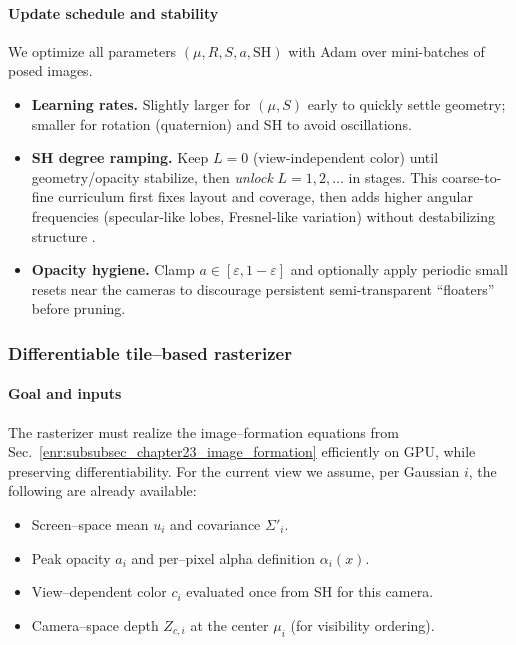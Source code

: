 \begin{enrichment}
\begin{enrichment}
\begin{enrichment}
        \paragraph{Update schedule and stability}
        We optimize all parameters $(\mu,R,S,a,\text{SH})$ with Adam over mini-batches of posed images.
        \begin{itemize}
            \item \textbf{Learning rates.} Slightly larger for $(\mu,S)$ early to quickly settle geometry; smaller for rotation (quaternion) and SH to avoid oscillations.
            \item \textbf{SH degree ramping.} Keep $L{=}0$ (view-independent color) until geometry/opacity stabilize, then \emph{unlock} $L{=}1,2,\ldots$ in stages. This coarse-to-fine curriculum first fixes layout and coverage, then adds higher angular frequencies (specular-like lobes, Fresnel-like variation) without destabilizing structure \cite{kerbl2023_3dgaussiansplatting}.
            \item \textbf{Opacity hygiene.} Clamp $a\in[\varepsilon,1-\varepsilon]$ and optionally apply periodic small resets near the cameras to discourage persistent semi-transparent ``floaters'' before pruning.
        \end{itemize}
        
        \subsubsection{Differentiable tile–based rasterizer}\label{enr:subsubsec_chapter23_3dgs_rasterizer}
        
        \paragraph{Goal and inputs}
        The rasterizer must realize the image–formation equations from Sec.~\ref{enr:subsubsec_chapter23_image_formation} efficiently on GPU, while preserving differentiability.
        For the current view we assume, per Gaussian $i$, the following are already available:
        \begin{itemize}
            \item Screen–space mean $u_i$ and covariance $\Sigma'_i$.
            \item Peak opacity $a_i$ and per–pixel alpha definition $\alpha_i(x)$.
            \item View–dependent color $c_i$ evaluated once from SH for this camera.
            \item Camera–space depth $Z_{c,i}$ at the center $\mu_i$ (for visibility ordering).
        \end{itemize}
        

\end{enrichment}
\end{enrichment}
\end{enrichment}
